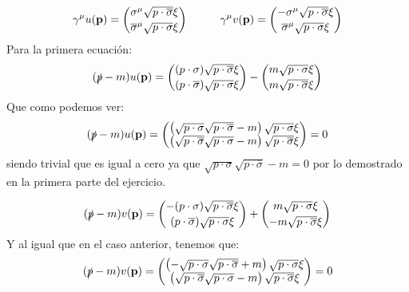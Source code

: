 \begin{solucion}
	\begin{equation*}
		\gamma^\mu u(\mathbf{p}) = \binom{\sigma^\mu \sqrt{p\cdot \overline{\sigma}} \xi}{\overline{\sigma}^\mu\sqrt{p\cdot \sigma} \xi } \quad \quad \quad 
		\gamma^\mu v(\mathbf{p}) = \binom{-\sigma^\mu \sqrt{p\cdot \overline{\sigma}} \xi}{\overline{\sigma}^\mu\sqrt{p\cdot \sigma} \xi }
	\end{equation*}
	Para la primera ecuación:
	\begin{equation*}
		( \slashed{p} - m ) u (\mathbf{p}) = \binom{(p\cdot \sigma) \sqrt{p \cdot \overline{\sigma}}\xi}{(p\cdot \overline{\sigma}) \sqrt{p \cdot \sigma}\xi} - \binom{m \sqrt{p\cdot \sigma} \xi}{m \sqrt{p\cdot \overline{\sigma} } \xi}
	\end{equation*}
	Que como podemos ver:
	\begin{equation*}
		( \slashed{p} - m ) u (\mathbf{p}) = \begin{pmatrix}
			\left( \sqrt{p\cdot \sigma }\sqrt{p \cdot \overline{\sigma}} - m  \right)  \sqrt{p\cdot \sigma } \xi \\ \left( \sqrt{p\cdot \overline{\sigma} } \sqrt{p \cdot \sigma} - m  \right)\sqrt{p\cdot \overline{\sigma} } \xi 
		\end{pmatrix}=0
	\end{equation*}
	siendo trivial que es igual a cero ya que $\sqrt{p\cdot \sigma }\sqrt{p \cdot \overline{\sigma}} - m=0$ por lo demostrado en la primera parte del ejercicio.
	
	\begin{equation*}
		( \slashed{p} - m ) v (\mathbf{p}) = \binom{-(p\cdot \sigma) \sqrt{p \cdot \overline{\sigma}}\xi}{(p\cdot \overline{\sigma}) \sqrt{p \cdot \sigma}\xi} + \binom{m \sqrt{p\cdot \sigma} \xi}{-m \sqrt{p\cdot \overline{\sigma} } \xi}
	\end{equation*}
	Y al igual que en el caso anterior, tenemos que:
	\begin{equation*}
		( \slashed{p} - m ) v (\mathbf{p}) = \begin{pmatrix}
			\left( -\sqrt{p\cdot \sigma }\sqrt{p \cdot \overline{\sigma}} + m  \right)  \sqrt{p\cdot \sigma } \xi \\ \left( \sqrt{p\cdot \overline{\sigma} } \sqrt{p \cdot \sigma} - m  \right)\sqrt{p\cdot \overline{\sigma} } \xi 
		\end{pmatrix}= 0
	\end{equation*}
	
\end{solucion}

